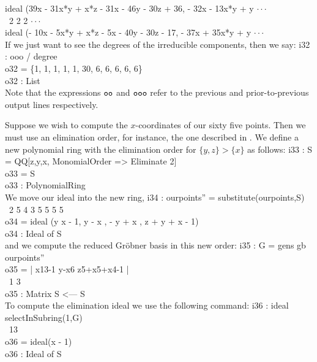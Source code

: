 ideal (39x  - 31x*y + x*z - 31x - 46y - 30z + 36, - 32x  - 13x*y + y   $\cdot\cdot\cdot$\\
\emptyLine
\            2                                          2            2  $\cdot\cdot\cdot$\\
ideal (- 10x  - 5x*y + x*z - 5x - 40y - 30z - 17, - 37x  + 35x*y + y   $\cdot\cdot\cdot$\\
\emptyLine
\endOutput
If we just want to see the degrees of the irreducible components, then
we say:
\beginOutput
i32 : ooo / degree\\
\emptyLine
o32 = \{1, 1, 1, 1, 1, 30, 6, 6, 6, 6, 6\}\\
\emptyLine
o32 : List\\
\endOutput
Note that the expressions ${\tt oo}$ 
and ${\tt ooo}$ refer to the previous and
prior-to-previous output lines respectively.

\medskip

Suppose we wish to compute the $x$-coordinates of our sixty five points.
Then we must use an elimination order, for instance, the
one described in \cite[\S 3.2, Exercise 6.a]{CLO1}.
We define a  new polynomial ring with the elimination order
for $\{y,z\} > \{x\}$ as follows:
\beginOutput
i33 : S = QQ[z,y,x, MonomialOrder => Eliminate 2]\\
\emptyLine
o33 = S\\
\emptyLine
o33 : PolynomialRing\\
\endOutput
We move our ideal into the new ring,
\beginOutput
i34 : ourpoints'' = substitute(ourpoints,S)\\
\emptyLine
\              2        5    4     3    5   5    5    5\\
o34 = ideal (y x - 1, y  - x , - y  + x , z  + y  + x  - 1)\\
\emptyLine
o34 : Ideal of S\\
\endOutput
and we compute the reduced Gr\"obner basis in this new order:
\beginOutput
i35 : G = gens gb ourpoints''\\
\emptyLine
o35 = | x13-1 y-x6 z5+x5+x4-1 |\\
\emptyLine
\              1       3\\
o35 : Matrix S  <--- S\\
\endOutput
To compute the elimination ideal we use the following command:
\beginOutput
i36 : ideal selectInSubring(1,G)\\
\emptyLine
\             13\\
o36 = ideal(x   - 1)\\
\emptyLine
o36 : Ideal of S\\
\endOutput

